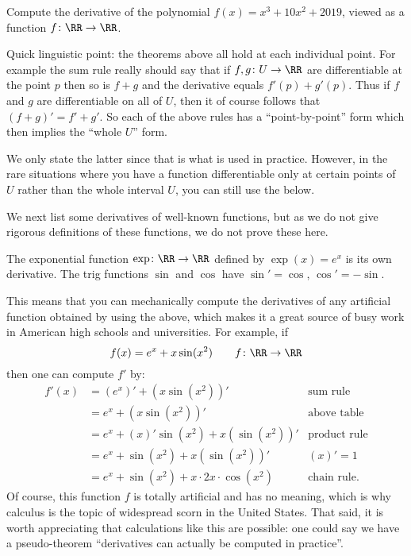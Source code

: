 \begin{exercise}
	Compute the derivative of the polynomial $f(x) = x^3 + 10x^2 + 2019$,
	viewed as a function $f \colon \RR \to \RR$.
\end{exercise}

\begin{remark}
	Quick linguistic point:
	the theorems above all hold at each individual point.
	For example the sum rule really should say that
	if $f,g \colon U \to \RR$ are differentiable at the point $p$
	then so is $f+g$ and the derivative equals $f'(p) + g'(p)$.
	Thus if $f$ and $g$ are differentiable on all of $U$,
	then it of course follows that $(f+g)' = f' + g'$.
	So each of the above rules has a ``point-by-point'' form
	which then implies the ``whole $U$'' form.

	We only state the latter since that is what is used in practice.
	However, in the rare situations where you have a function
	differentiable only at certain points of $U$ rather
	than the whole interval $U$, you can still use the below.
\end{remark}

We next list some derivatives of well-known functions,
but as we do not give rigorous definitions
of these functions, we do not prove these here.
\begin{proposition}
	\listhack
	\begin{itemize}
		\ii The exponential function $\exp \colon \RR \to \RR$
		defined by $\exp(x) = e^x$ is its own derivative.
		\ii The trig functions $\sin$ and $\cos$
		have $\sin' = \cos$, $\cos' = -\sin$.
	\end{itemize}
\end{proposition}

\begin{example}
	This means that you can mechanically compute
	the derivatives of any artificial function obtained by using the above,
	which makes it a great source of busy work
	in American high schools and universities.
	For example, if
	\[ f(x) = e^x + x \sin(x^2) \qquad f \colon \RR \to \RR \]
	then one can compute $f'$ by:
	\begin{align*}
		f'(x) &= (e^x)' + (x \sin(x^2))' & \text{sum rule} \\
		&= e^x + (x \sin(x^2))' & \text{above table} \\
		&= e^x + (x)' \sin(x^2) + x (\sin(x^2))' & \text{product rule} \\
		&= e^x + \sin(x^2) + x (\sin(x^2))' & (x)' = 1 \\
		&= e^x + \sin(x^2) + x \cdot 2x \cdot \cos(x^2) & \text{chain rule}.
	\end{align*}
	Of course, this function $f$ is totally artificial and has no meaning,
	which is why calculus is the topic of widespread scorn in the United States.
	That said, it is worth appreciating that calculations like this are possible:
	one could say we have a pseudo-theorem
	``derivatives can actually be computed in practice''.
\end{example}

